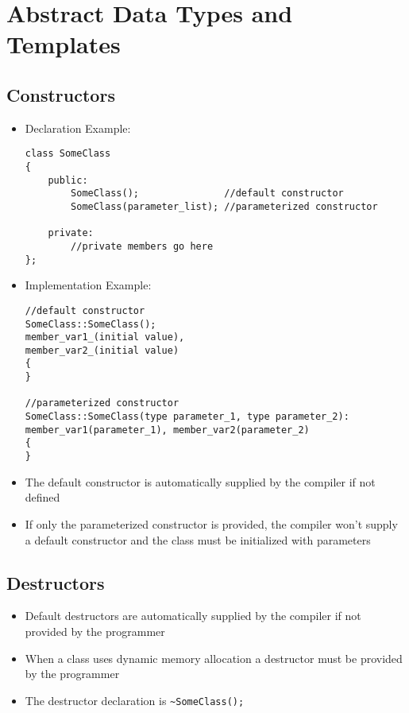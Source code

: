 \documentclass{article}
\begin{document}
\pagebreak

\section{Abstract Data Types and Templates}
\subsection{Constructors}
\begin{itemize}
    \item Declaration Example:
    \begin{verbatim}
class SomeClass
{
    public:
        SomeClass();               //default constructor
        SomeClass(parameter_list); //parameterized constructor
    
    private:
        //private members go here
};
    \end{verbatim}
    \item Implementation Example:
    \begin{verbatim}  
//default constructor
SomeClass::SomeClass();
member_var1_(initial value),
member_var2_(initial value)
{
}

//parameterized constructor
SomeClass::SomeClass(type parameter_1, type parameter_2): 
member_var1(parameter_1), member_var2(parameter_2) 
{ 
}
\end{verbatim}
    \item The default constructor is automatically supplied by the compiler if not defined
    \item If only the parameterized constructor is provided, the compiler won't supply a default constructor and the class must be initialized with parameters
\end{itemize}

\subsection{Destructors}
\begin{itemize}
    \item Default destructors are automatically supplied by the compiler if not provided by the programmer
    \item When a class uses dynamic memory allocation a destructor must be provided by the programmer
    \item The destructor declaration is \verb|~SomeClass();|
\end{itemize}
\end{document}
